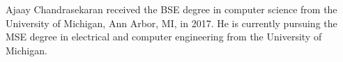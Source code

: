 \documentclass[journal]{IEEEtran}
\begin{document}
\begin{IEEEbiographynophoto}{Ajaay Chandrasekaran}
  received the BSE degree in computer science from the University of Michigan, Ann Arbor, MI, in 2017.
  He is currently pursuing the MSE degree in electrical and computer engineering from the University of Michigan.%
\end{IEEEbiographynophoto}

\vfill









\end{document}

